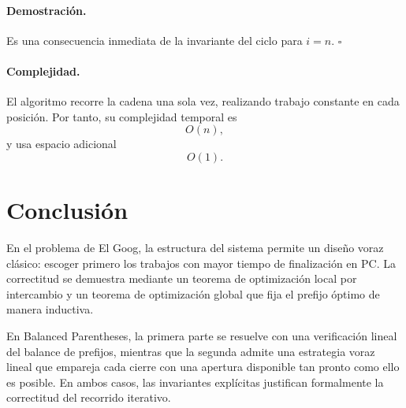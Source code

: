 \documentclass[11pt]{article}
\begin{document}
\paragraph{Demostración.}
Es una consecuencia inmediata de la invariante del ciclo para \(i=n\). \(\square\)

\paragraph{Complejidad.}
El algoritmo recorre la cadena una sola vez, realizando trabajo constante en cada
posición. Por tanto, su complejidad temporal es
\[
O(n),
\]
y usa espacio adicional
\[
O(1).
\]

\section*{Conclusión}

En el problema de El Goog, la estructura del sistema permite un diseño voraz clásico:
escoger primero los trabajos con mayor tiempo de finalización en PC. La correctitud
se demuestra mediante un teorema de optimización local por intercambio y un teorema
de optimización global que fija el prefijo óptimo de manera inductiva.

En Balanced Parentheses, la primera parte se resuelve con una verificación lineal del
balance de prefijos, mientras que la segunda admite una estrategia voraz lineal que
empareja cada cierre con una apertura disponible tan pronto como ello es posible.
En ambos casos, las invariantes explícitas justifican formalmente la correctitud del
recorrido iterativo.
\end{document}
